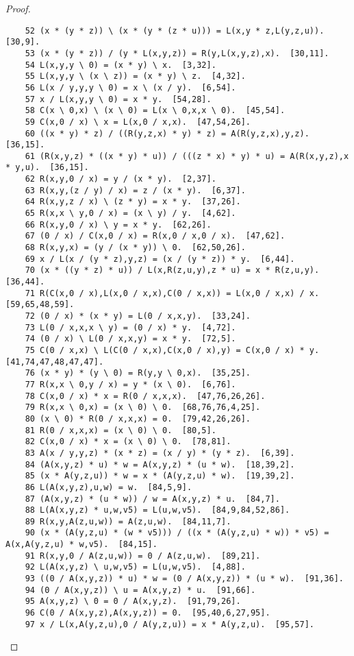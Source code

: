 \documentclass[12pt]{report}
\theoremstyle{definition}
\begin{document}
\begin{proof}
\begin{lstlisting}
    52 (x * (y * z)) \ (x * (y * (z * u))) = L(x,y * z,L(y,z,u)).  [30,9].
    53 (x * (y * z)) / (y * L(x,y,z)) = R(y,L(x,y,z),x).  [30,11].
    54 L(x,y,y \ 0) = (x * y) \ x.  [3,32].
    55 L(x,y,y \ (x \ z)) = (x * y) \ z.  [4,32].
    56 L(x / y,y,y \ 0) = x \ (x / y).  [6,54].
    57 x / L(x,y,y \ 0) = x * y.  [54,28].
    58 C(x \ 0,x) \ (x \ 0) = L(x \ 0,x,x \ 0).  [45,54].
    59 C(x,0 / x) \ x = L(x,0 / x,x).  [47,54,26].
    60 ((x * y) * z) / ((R(y,z,x) * y) * z) = A(R(y,z,x),y,z).  [36,15].
    61 (R(x,y,z) * ((x * y) * u)) / (((z * x) * y) * u) = A(R(x,y,z),x * y,u).  [36,15].
    62 R(x,y,0 / x) = y / (x * y).  [2,37].
    63 R(x,y,(z / y) / x) = z / (x * y).  [6,37].
    64 R(x,y,z / x) \ (z * y) = x * y.  [37,26].
    65 R(x,x \ y,0 / x) = (x \ y) / y.  [4,62].
    66 R(x,y,0 / x) \ y = x * y.  [62,26].
    67 (0 / x) / C(x,0 / x) = R(x,0 / x,0 / x).  [47,62].
    68 R(x,y,x) = (y / (x * y)) \ 0.  [62,50,26].
    69 x / L(x / (y * z),y,z) = (x / (y * z)) * y.  [6,44].
    70 (x * ((y * z) * u)) / L(x,R(z,u,y),z * u) = x * R(z,u,y).  [36,44].
    71 R(C(x,0 / x),L(x,0 / x,x),C(0 / x,x)) = L(x,0 / x,x) / x.  [59,65,48,59].
    72 (0 / x) * (x * y) = L(0 / x,x,y).  [33,24].
    73 L(0 / x,x,x \ y) = (0 / x) * y.  [4,72].
    74 (0 / x) \ L(0 / x,x,y) = x * y.  [72,5].
    75 C(0 / x,x) \ L(C(0 / x,x),C(x,0 / x),y) = C(x,0 / x) * y.  [41,74,47,48,47,47].
    76 (x * y) * (y \ 0) = R(y,y \ 0,x).  [35,25].
    77 R(x,x \ 0,y / x) = y * (x \ 0).  [6,76].
    78 C(x,0 / x) * x = R(0 / x,x,x).  [47,76,26,26].
    79 R(x,x \ 0,x) = (x \ 0) \ 0.  [68,76,76,4,25].
    80 (x \ 0) * R(0 / x,x,x) = 0.  [79,42,26,26].
    81 R(0 / x,x,x) = (x \ 0) \ 0.  [80,5].
    82 C(x,0 / x) * x = (x \ 0) \ 0.  [78,81].
    83 A(x / y,y,z) * (x * z) = (x / y) * (y * z).  [6,39].
    84 (A(x,y,z) * u) * w = A(x,y,z) * (u * w).  [18,39,2].
    85 (x * A(y,z,u)) * w = x * (A(y,z,u) * w).  [19,39,2].
    86 L(A(x,y,z),u,w) = w.  [84,5,9].
    87 (A(x,y,z) * (u * w)) / w = A(x,y,z) * u.  [84,7].
    88 L(A(x,y,z) * u,w,v5) = L(u,w,v5).  [84,9,84,52,86].
    89 R(x,y,A(z,u,w)) = A(z,u,w).  [84,11,7].
    90 (x * (A(y,z,u) * (w * v5))) / ((x * (A(y,z,u) * w)) * v5) = A(x,A(y,z,u) * w,v5).  [84,15].
    91 R(x,y,0 / A(z,u,w)) = 0 / A(z,u,w).  [89,21].
    92 L(A(x,y,z) \ u,w,v5) = L(u,w,v5).  [4,88].
    93 ((0 / A(x,y,z)) * u) * w = (0 / A(x,y,z)) * (u * w).  [91,36].
    94 (0 / A(x,y,z)) \ u = A(x,y,z) * u.  [91,66].
    95 A(x,y,z) \ 0 = 0 / A(x,y,z).  [91,79,26].
    96 C(0 / A(x,y,z),A(x,y,z)) = 0.  [95,40,6,27,95].
    97 x / L(x,A(y,z,u),0 / A(y,z,u)) = x * A(y,z,u).  [95,57].

\end{lstlisting}
\end{proof}
\end{document}
